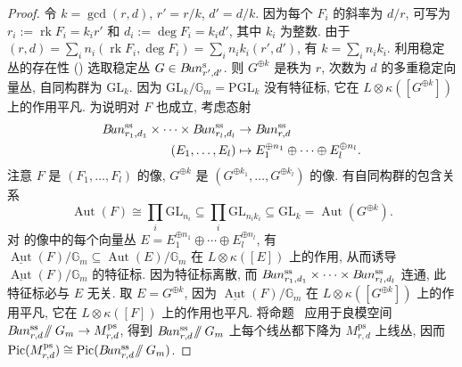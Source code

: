 \begin{proof}
令 $k=\gcd(r,d)$, $r'=r/k$, $d'=d/k$. 因为每个 $F_i$ 的斜率为 $d/r$, 可写为 $r_i:=\operatorname{rk}F_i=k_ir'$ 和 $d_i:=\deg F_i=k_id'$, 其中 $k_i$ 为整数. 由于 $(r,d)=\sum_i n_i(\operatorname{rk}F_i,\deg F_i)=\sum_i n_ik_i(r',d')$, 有 $k=\sum_i n_ik_i$. 利用稳定丛的存在性 () 选取稳定丛 $G\in B\!un_{r',d'}^{\mathrm s}$. 则 $G^{\oplus k}$ 是秩为 $r$, 次数为 $d$ 的多重稳定向量丛, 自同构群为 $\mathrm{GL}_k$. 因为 $\mathrm{GL}_k/\mathbb G_m=\mathrm{PGL}_k$ 没有特征标, 它在 $L\otimes\kappa([G^{\oplus k}])$ 上的作用平凡. 为说明对 $F$ 也成立, 考虑态射
\begin{equation}\label{src:9.4.14}
\begin{aligned}
B\!un_{r_1,d_1}^{\mathrm{ss}}\times\cdots\times B\!un_{r_l,d_l}^{\mathrm{ss}}&\to B\!un_{r,d}^{\mathrm{ss}}\\
(E_1,\ldots,E_l)&\mapsto E_1^{\oplus n_1}\oplus\cdots\oplus E_l^{\oplus n_l}.
\end{aligned}
\end{equation}
注意 $F$ 是 $(F_1,\ldots,F_l)$ 的像, $G^{\oplus k}$ 是 $(G^{\oplus k_1},\ldots,G^{\oplus k_l})$ 的像. 有自同构群的包含关系
\[
\operatorname{Aut}(F)\cong\prod_i\mathrm{GL}_{n_i}\subseteq
\prod_i\mathrm{GL}_{n_ik_i}\subseteq\mathrm{GL}_k=\operatorname{Aut}(G^{\oplus k}).
\]
对  的像中的每个向量丛 $E=E_1^{\oplus n_1}\oplus\cdots\oplus E_l^{\oplus n_l}$, 有 $\underline{\operatorname{Aut}}(F)/\mathbb G_m\subseteq\operatorname{Aut}(E)/\mathbb G_m$ 在 $L\otimes\kappa([E])$ 上的作用, 从而诱导 $\underline{\operatorname{Aut}}(F)/\mathbb G_m$ 的特征标. 因为特征标离散, 而 $B\!un_{r_1,d_1}^{\mathrm{ss}}\times\cdots\times B\!un_{r_l,d_l}^{\mathrm{ss}}$ 连通, 此特征标必与 $E$ 无关. 取 $E=G^{\oplus k}$, 因为 $\underline{\operatorname{Aut}}(F)/\mathbb G_m$ 在 $L\otimes\kappa([G^{\oplus k}])$ 上的作用平凡, 它在 $L\otimes\kappa([F])$ 上的作用也平凡. 将命题~ 应用于良模空间 $B\!un_{r,d}^{\mathrm{ss}}\!\mathbin{/\mkern-6mu/}G_m\to M_{r,d}^{\mathrm{ps}}$, 得到 $B\!un_{r,d}^{\mathrm{ss}}\!\mathbin{/\mkern-6mu/}G_m$ 上每个线丛都下降为 $M_{r,d}^{\mathrm{ps}}$ 上线丛, 因而 $\operatorname{Pic}(M_{r,d}^{\mathrm{ps}})\cong\operatorname{Pic}(B\!un_{r,d}^{\mathrm{ss}}\!\mathbin{/\mkern-6mu/}G_m)$.
\end{proof}
